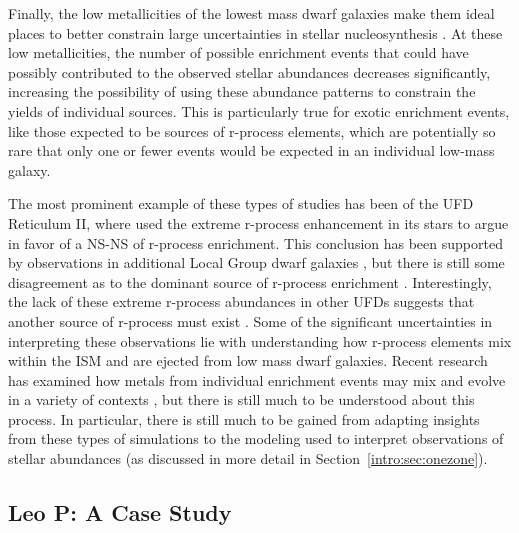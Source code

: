 Finally, the low metallicities of the lowest mass dwarf galaxies make them ideal places to better constrain large uncertainties in stellar nucleosynthesis \citep{FrebelNorris2015,Frebel2018}. At these low metallicities, the number of possible enrichment events that could have possibly contributed to the observed stellar abundances decreases significantly, increasing the possibility of using these abundance patterns to constrain the yields of individual sources. This is particularly true for exotic enrichment events, like those expected to be sources of r-process elements, which are potentially so rare that only one or fewer events would be expected in an individual low-mass galaxy.

The most prominent example of these types of studies has been of the UFD Reticulum II, where \cite{Ji2016} used the extreme r-process enhancement in its stars to argue in favor of a NS-NS of r-process enrichment. This conclusion has been supported by observations in additional Local Group dwarf galaxies \citep{Duggan2018}, but there is still some disagreement as to the dominant source of r-process enrichment \citep[e.g.][]{Siegel2018}. Interestingly, the lack of these extreme r-process abundances in other UFDs suggests that another source of r-process must exist \citep{Ji2016b}. Some of the significant uncertainties in interpreting these observations lie with understanding how r-process elements mix within the ISM and are ejected from low mass dwarf galaxies. Recent research has examined how metals from individual enrichment events may mix and evolve in a variety of contexts \citep[e.g.][]{Bland-Hawthorn2015,Ritter2015,Montes2016,Safarzadeh2017}, but there is still much to be understood about this process. In particular, there is still much to be gained from adapting insights from these types of simulations to the modeling used to interpret observations of stellar abundances (as discussed in more detail in Section~\ref{intro:sec:onezone}).

\subsection{Leo P: A Case Study}
\label{intro:sec:Leo P}

